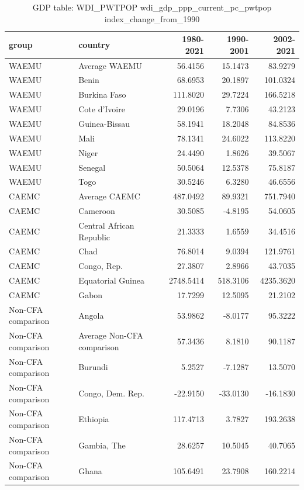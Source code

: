 \begin{table}

\caption{GDP table: WDI_PWTPOP wdi_gdp_ppp_current_pc_pwtpop index_change_from_1990}
\centering
\begin{tabular}[t]{llrrr}
\toprule
group & country & 1980-2021 & 1990-2001 & 2002-2021\\
\midrule
WAEMU & Average WAEMU & 56.4156 & 15.1473 & 83.9279\\
WAEMU & Benin & 68.6953 & 20.1897 & 101.0324\\
WAEMU & Burkina Faso & 111.8020 & 29.7224 & 166.5218\\
WAEMU & Cote d'Ivoire & 29.0196 & 7.7306 & 43.2123\\
WAEMU & Guinea-Bissau & 58.1941 & 18.2048 & 84.8536\\
\addlinespace
WAEMU & Mali & 78.1341 & 24.6022 & 113.8220\\
WAEMU & Niger & 24.4490 & 1.8626 & 39.5067\\
WAEMU & Senegal & 50.5064 & 12.5378 & 75.8187\\
WAEMU & Togo & 30.5246 & 6.3280 & 46.6556\\
CAEMC & Average CAEMC & 487.0492 & 89.9321 & 751.7940\\
\addlinespace
CAEMC & Cameroon & 30.5085 & -4.8195 & 54.0605\\
CAEMC & Central African Republic & 21.3333 & 1.6559 & 34.4516\\
CAEMC & Chad & 76.8014 & 9.0394 & 121.9761\\
CAEMC & Congo, Rep. & 27.3807 & 2.8966 & 43.7035\\
CAEMC & Equatorial Guinea & 2748.5414 & 518.3106 & 4235.3620\\
\addlinespace
CAEMC & Gabon & 17.7299 & 12.5095 & 21.2102\\
Non-CFA comparison & Angola & 53.9862 & -8.0177 & 95.3222\\
Non-CFA comparison & Average Non-CFA comparison & 57.3436 & 8.1810 & 90.1187\\
Non-CFA comparison & Burundi & 5.2527 & -7.1287 & 13.5070\\
Non-CFA comparison & Congo, Dem. Rep. & -22.9150 & -33.0130 & -16.1830\\
\addlinespace
Non-CFA comparison & Ethiopia & 117.4713 & 3.7827 & 193.2638\\
Non-CFA comparison & Gambia, The & 28.6257 & 10.5045 & 40.7065\\
Non-CFA comparison & Ghana & 105.6491 & 23.7908 & 160.2214\\

\end{tabular}
\end{table}

